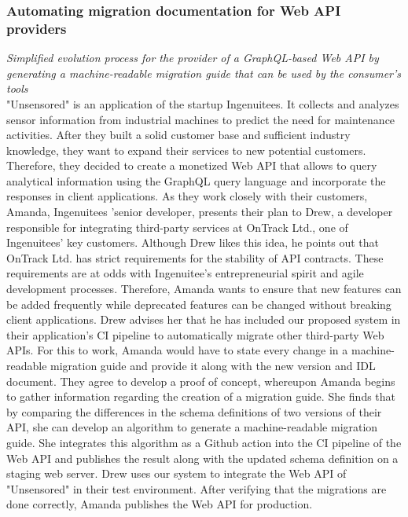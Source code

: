 \subsubsection{Automating migration documentation for Web API providers}
\label{subsubsec:Scenario:graphQLScenario}

\textit{Simplified evolution process for the provider of a GraphQL-based Web API by generating a machine-readable migration guide that can be used by the consumer's tools}
\medskip
\\ "Unsensored" is an application of the startup Ingenuitees. It collects and analyzes sensor information from industrial machines to predict the need for maintenance activities. After they built a solid customer base and sufficient industry knowledge, they want to expand their services to new potential customers. Therefore, they decided to create a monetized Web API that allows to query analytical information using the GraphQL query language and incorporate the responses in client applications. As they work closely with their customers, Amanda, Ingenuitees 'senior developer, presents their plan to Drew, a developer responsible for integrating third-party services at OnTrack Ltd., one of Ingenuitees' key customers. Although Drew likes this idea, he points out that OnTrack Ltd. has strict requirements for the stability of API contracts. These requirements are at odds with Ingenuitee's entrepreneurial spirit and agile development processes. Therefore, Amanda wants to ensure that new features can be added frequently while deprecated features can be changed without breaking client applications. Drew advises her that he has included our proposed system in their application's CI pipeline to automatically migrate other third-party Web APIs. For this to work, Amanda would have to state every change in a machine-readable migration guide and provide it along with the new version and IDL document. They agree to develop a proof of concept, whereupon Amanda begins to gather information regarding the creation of a migration guide. She finds that by comparing the differences in the schema definitions of two versions of their API, she can develop an algorithm to generate a machine-readable migration guide. She integrates this algorithm as a Github action into the CI pipeline of the Web API and publishes the result along with the updated schema definition on a staging web server. Drew uses our system to integrate the Web API of "Unsensored" in their test environment. After verifying that the migrations are done correctly, Amanda publishes the Web API for production.